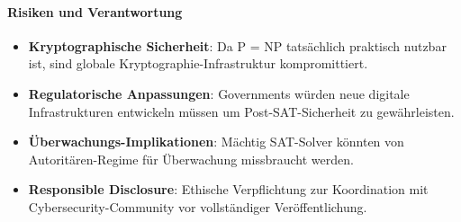 ﻿\documentclass[a4paper,12pt]{article}
\theoremstyle{definition}
\begin{document}
\paragraph{Risiken und Verantwortung}

\begin{itemize}
	\item \textbf{Kryptographische Sicherheit}: Da P = NP tatsächlich praktisch nutzbar ist, sind globale Kryptographie-Infrastruktur kompromittiert.
	
	\item \textbf{Regulatorische Anpassungen}: Governments würden neue digitale Infrastrukturen entwickeln müssen um Post-SAT-Sicherheit zu gewährleisten.
	
	\item \textbf{Überwachungs-Implikationen}: Mächtig SAT-Solver könnten von Autoritären-Regime für Überwachung missbraucht werden.
	
	\item \textbf{Responsible Disclosure}: Ethische Verpflichtung zur Koordination mit Cybersecurity-Community vor vollständiger Veröffentlichung.
\end{itemize}

\end{document}
